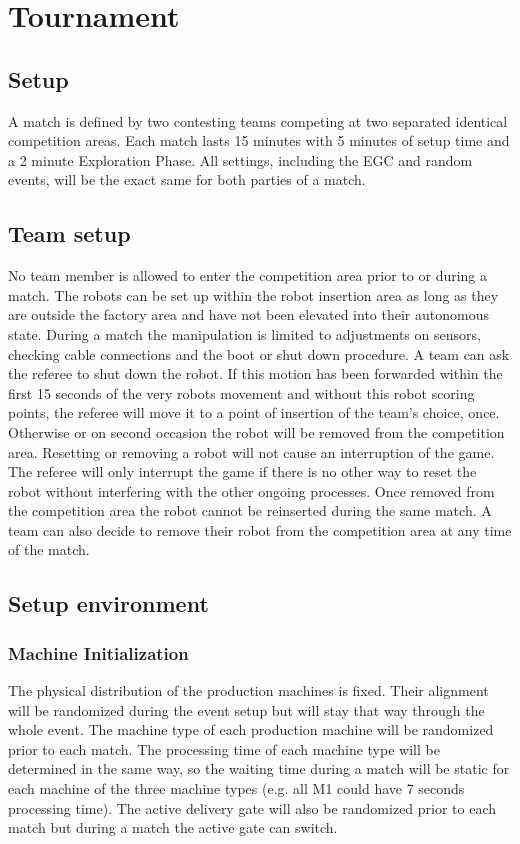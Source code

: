 \documentclass[12pt,twoside]{article}
\begin{document}
\section{Tournament}
\subsection{Setup}

A match is defined by two contesting teams competing at two separated
identical competition areas. Each match lasts 15 minutes with 5
minutes of setup time and a 2 minute Exploration Phase. All settings, including
the EGC and random events, will be the exact same for both parties of a match.

\subsection{Team setup}
\label{sec:team-setup}
No team member is allowed to enter the competition area prior to or
during a match. The robots can be set up within the robot insertion
area as long as they are outside the factory area and have not been
elevated into their autonomous state. During a match the manipulation
is limited to adjustments on sensors, checking cable connections and
the boot or shut down procedure. A team can ask the referee to shut
down the robot. If this motion has been forwarded within the first 15
seconds of the very robots movement and without this robot scoring
points, the referee will move it to a point of insertion of the team's
choice, once. Otherwise or on second occasion the robot will be
removed from the competition area. Resetting or removing a robot will
not cause an interruption of the game. The referee will only interrupt
the game if there is no other way to reset the robot without
interfering with the other ongoing processes. Once removed from the
competition area the robot cannot be reinserted during the same match.
A team can also decide to remove their robot from the competition area
at any time of the match.

\subsection{Setup environment}
\subsubsection{Machine Initialization}

The physical distribution of the production machines is fixed. Their
alignment will be randomized during the event setup but will stay that
way through the whole event. The machine type of each production
machine will be randomized prior to each match. The processing time of
each machine type will be determined in the same way, so the waiting
time during a match will be static for each machine of the three
machine types (e.g. all M1 could have 7 seconds processing time). The
active delivery gate will also be randomized prior to each match but
during a match the active gate can switch.
\end{document}
